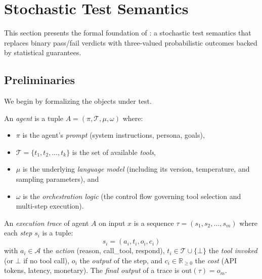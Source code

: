 
\section{Stochastic Test Semantics}
\label{sec:stochastic}

This section presents the formal foundation of \agentassay{}: a
stochastic test semantics that replaces binary pass/fail verdicts with
three-valued probabilistic outcomes backed by statistical guarantees.

\subsection{Preliminaries}
\label{sec:stochastic:prelim}

We begin by formalizing the objects under test.

\begin{definition}[Agent]
\label{def:agent}
An \emph{agent} is a tuple $A = (\pi, \mathcal{T}, \mu, \omega)$ where:
\begin{itemize}[leftmargin=*]
  \item $\pi$ is the agent's \emph{prompt} (system instructions, persona,
    goals),
  \item $\mathcal{T} = \{t_1, t_2, \ldots, t_k\}$ is the set of
    available \emph{tools},
  \item $\mu$ is the underlying \emph{language model} (including its
    version, temperature, and sampling parameters), and
  \item $\omega$ is the \emph{orchestration logic} (the control flow
    governing tool selection and multi-step execution).
\end{itemize}
\end{definition}

\begin{definition}
\label{def:trace}
An \emph{execution trace} of agent $A$ on input $x$ is a sequence
$\tau = (s_1, s_2, \ldots, s_m)$ where each \emph{step} $s_i$ is a
tuple:
\[
  s_i = (a_i, t_i, o_i, c_i)
\]
with $a_i \in \mathcal{A}$ the \emph{action} (reason, call\_tool,
respond), $t_i \in \mathcal{T} \cup \{\bot\}$ the \emph{tool invoked}
(or $\bot$ if no tool call), $o_i$ the \emph{output} of the step, and
$c_i \in \mathbb{R}_{\geq 0}$ the \emph{cost} (API tokens, latency, monetary).
The \emph{final output} of a trace is $\mathrm{out}(\tau) = o_m$.
\end{definition}

